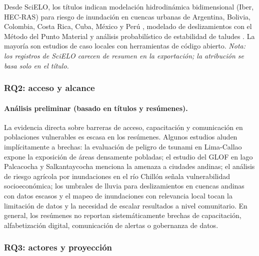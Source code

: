 \documentclass[12pt,a4paper]{article}
\begin{document}
Desde SciELO, los títulos indican modelación hidrodinámica bidimensional (Iber, HEC-RAS) para riesgo de inundación en cuencas urbanas de Argentina, Bolivia, Colombia, Costa Rica, Cuba, México y Perú \parencite{snchezpineda2025evaluaci, rojasguerrero2025lisis, la2025modelizaci, gutirrezgarca2022modelaci, zamora2021evaluaci, crdovalpez2021alternativas, crdovadehorta2021simulaci}, modelado de deslizamientos con el Método del Punto Material \parencite{lemus2024modelaci} y análisis probabilístico de estabilidad de taludes \parencite{ariasvalencia2024lisis}. La mayoría son estudios de caso locales con herramientas de código abierto. \textit{Nota: los registros de SciELO carecen de resumen en la exportación; la atribución se basa solo en el título.}

\subsubsection{RQ2: acceso y alcance}
\label{sec:rq2}
\paragraph*{Análisis preliminar (basado en títulos y resúmenes).}
La evidencia directa sobre barreras de acceso, capacitación y comunicación en poblaciones vulnerables es escasa en los resúmenes. Algunos estudios aluden implícitamente a brechas: la evaluación de peligro de tsunami en Lima-Callao \parencite{quesquen2025tsunami, androsov2024nonlinear, garcia2025parallel} expone la exposición de áreas densamente pobladas; el estudio del GLOF en lago Palcacocha \parencite{stuartsmith2021increased} y Salkantaycocha \parencite{vilca2021glacial} menciona la amenaza a ciudades andinas; el análisis de riesgo agrícola por inundaciones en el río Chillón \parencite{lpezsilva2025spatial} señala vulnerabilidad socioeconómica; los umbrales de lluvia para deslizamientos en cuencas andinas con datos escasos \parencite{marin2021assessing} y el mapeo de inundaciones con relevancia local \parencite{kuchinski2025regional} tocan la limitación de datos y la necesidad de escalar resultados a nivel comunitario. En general, los resúmenes no reportan sistemáticamente brechas de capacitación, alfabetización digital, comunicación de alertas o gobernanza de datos.

\subsubsection{RQ3: actores y proyección}
\label{sec:rq3}
\end{document}
